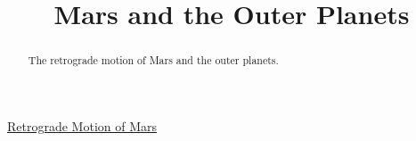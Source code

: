 \documentclass{ximera}
\title{Mars and the Outer Planets}
\begin{document}
\begin{abstract}
The retrograde motion of Mars and the outer planets.
\end{abstract}
\maketitle

\begin{exploration} \label{Exphjhhkjglvg}

\begin{center}
\end{center}

\href{https://www.youtube.com/watch?v=1nVSzzYCAYk}{Retrograde Motion of Mars}

\end{exploration}
\end{document}
